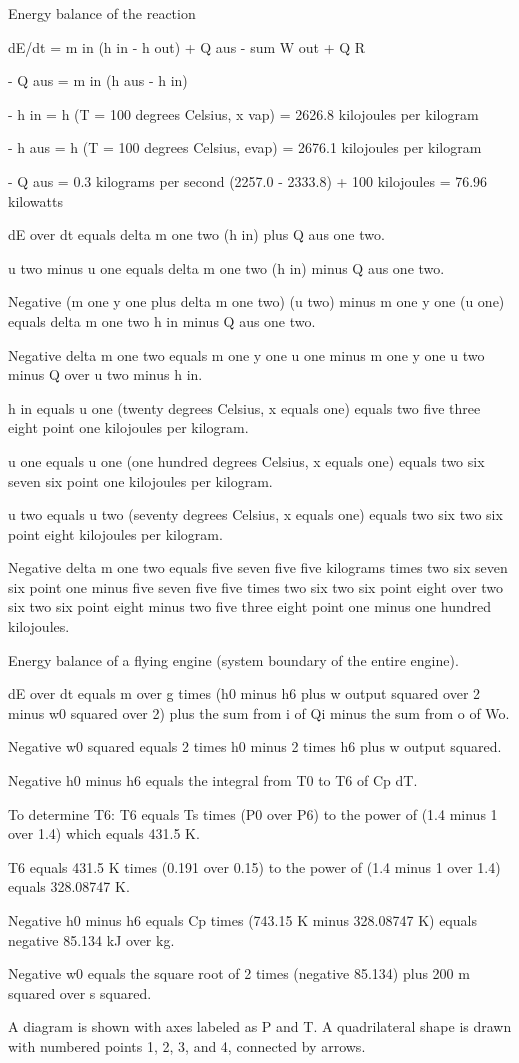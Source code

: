 Energy balance of the reaction

dE/dt = m in (h in - h out) + Q aus - sum W out + Q R

- Q aus = m in (h aus - h in)

- h in = h (T = 100 degrees Celsius, x vap) = 2626.8 kilojoules per kilogram

- h aus = h (T = 100 degrees Celsius, evap) = 2676.1 kilojoules per kilogram

- Q aus = 0.3 kilograms per second (2257.0 - 2333.8) + 100 kilojoules = 76.96 kilowatts

dE over dt equals delta m one two (h in) plus Q aus one two.

u two minus u one equals delta m one two (h in) minus Q aus one two.

Negative (m one y one plus delta m one two) (u two) minus m one y one (u one) equals delta m one two h in minus Q aus one two.

Negative delta m one two equals m one y one u one minus m one y one u two minus Q over u two minus h in.

h in equals u one (twenty degrees Celsius, x equals one) equals two five three eight point one kilojoules per kilogram.

u one equals u one (one hundred degrees Celsius, x equals one) equals two six seven six point one kilojoules per kilogram.

u two equals u two (seventy degrees Celsius, x equals one) equals two six two six point eight kilojoules per kilogram.

Negative delta m one two equals five seven five five kilograms times two six seven six point one minus five seven five five times two six two six point eight over two six two six point eight minus two five three eight point one minus one hundred kilojoules.

Energy balance of a flying engine (system boundary of the entire engine).

dE over dt equals m over g times (h0 minus h6 plus w output squared over 2 minus w0 squared over 2) plus the sum from i of Qi minus the sum from o of Wo.

Negative w0 squared equals 2 times h0 minus 2 times h6 plus w output squared.

Negative h0 minus h6 equals the integral from T0 to T6 of Cp dT.

To determine T6: T6 equals Ts times (P0 over P6) to the power of (1.4 minus 1 over 1.4) which equals 431.5 K.

T6 equals 431.5 K times (0.191 over 0.15) to the power of (1.4 minus 1 over 1.4) equals 328.08747 K.

Negative h0 minus h6 equals Cp times (743.15 K minus 328.08747 K) equals negative 85.134 kJ over kg.

Negative w0 equals the square root of 2 times (negative 85.134) plus 200 m squared over s squared.

A diagram is shown with axes labeled as P and T. A quadrilateral shape is drawn with numbered points 1, 2, 3, and 4, connected by arrows.